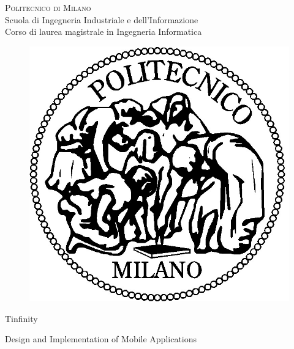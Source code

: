 \documentclass[15pt,a4paper,oneside]{article}
\begin{document}
\thispagestyle{empty}
\enlargethispage{60mm}
\begin{center}
\Large{\textsc{Politecnico di Milano}}\\
\large{Scuola di Ingegneria Industriale e dell'Informazione}\\
\large{Corso di laurea magistrale in Ingegneria Informatica}\\
\vspace{7mm}
\begin{figure}[h]
\begin{center}
\includegraphics[scale=0.15]{./images/logo-polimi}
\end{center}
\end{figure}
\vspace{2mm}

\begin{huge}
\begin{center}
Tinfinity
\end{center}
\end{huge}
\vspace{25mm}

\begin{LARGE}
\begin{center}
Design and Implementation of Mobile Applications
\end{center}
\vspace{2mm}
\end{LARGE}
\vspace{20mm}



\end{center}
\end{document}
